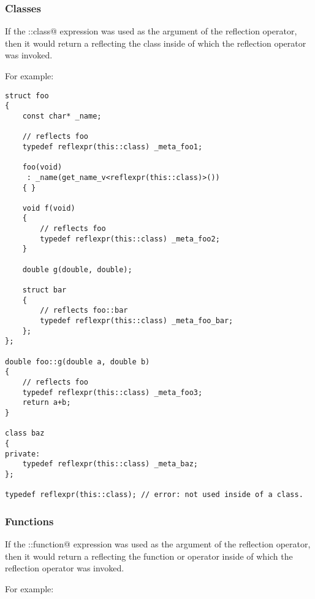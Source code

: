 \subsubsection{Classes}

If the \verb@this::class@ expression was used as the argument of the reflection
operator, then it would return a  reflecting the class
inside of which the reflection operator was invoked.

For example:

\begin{verbatim}
struct foo
{
	const char* _name;

	// reflects foo
	typedef reflexpr(this::class) _meta_foo1;

	foo(void)
	 : _name(get_name_v<reflexpr(this::class)>())
	{ }

	void f(void)
	{
		// reflects foo
		typedef reflexpr(this::class) _meta_foo2;
	}

	double g(double, double);

	struct bar
	{
		// reflects foo::bar
		typedef reflexpr(this::class) _meta_foo_bar;
	};
};

double foo::g(double a, double b)
{
	// reflects foo
	typedef reflexpr(this::class) _meta_foo3;
	return a+b;
}

class baz
{
private:
	typedef reflexpr(this::class) _meta_baz;
};

typedef reflexpr(this::class); // error: not used inside of a class.

\end{verbatim}

\subsubsection{Functions}

If the \verb@this::function@ expression was used as the argument of the reflection
operator, then it would return a  reflecting the function or operator
inside of which the reflection operator was invoked.

For example:

